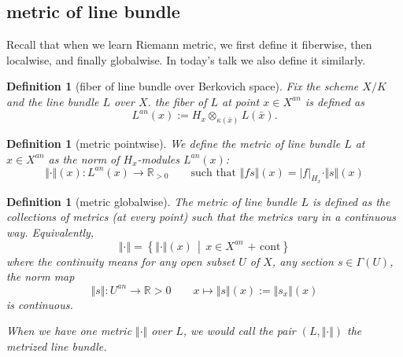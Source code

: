 \documentclass[reqno,11pt]{amsart}
\numberwithin{equation}{section}
\theoremstyle{plain}
\newtheorem{defn}[theorem]{Definition}
\theoremstyle{plain}
\numberwithin{equation}{section}
\theoremstyle{remark}
\newcommand{\norm}[1]{\Vert{#1}\Vert}
\begin{document}
\subsection{metric of line bundle}
Recall that when we learn Riemann metric, we first define it fiberwise, then localwise, and finally globalwise. In today's talk we also define it similarly.

\begin{defn}[fiber of line bundle over Berkovich space]
Fix the scheme $X/K$ and the line bundle $L$ over $X$. the fiber of $L$ at point $x \in X^{an}$ is defined as
$$L^{an}(x):= H_x \otimes_{\kappa(\bar{x}) }L(\bar{x}).$$

\end{defn}
\begin{center}

\end{center}
\begin{defn}[metric pointwise]
We define the metric of line bundle $L$ at $x \in X^{an}$ as the norm of $H_x$-modules $L^{an}(x)$:
$$\norm{\cdot}(x):L^{an}(x) \longrightarrow \mathbb{R}_{>0} \qquad \text{such that }\norm{fs}(x)=|f|_{H_x} \cdot\norm{s}(x) $$
\end{defn}
\begin{defn}[metric globalwise]
The metric of line bundle $L$ is defined as the collections of metrics (at every point) such that the metrics vary in a continuous way. Equivalently,
$$\norm{\cdot}=\left\{ \norm{\cdot}(x)\, \middle|\, x\in X^{an} \text{ + cont} \right\}$$
where the continuity means for any open subset $U$ of $X$, any section $s \in \Gamma(U)$, the norm map
$$\norm{s}: U^{an} \longrightarrow \mathbb{R}>0 \qquad x \longmapsto \norm{s}(x):=\norm{s_x}(x)$$
is continuous.

When we have one metric $\norm{\cdot}$ over $L$, we would call the pair $(L,\norm{\cdot})$ the metrized line bundle.
\end{defn}
\end{document}
